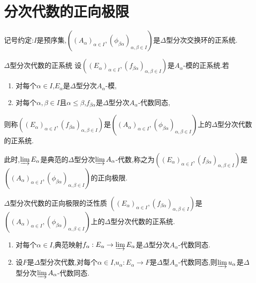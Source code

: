 \section{分次代数的正向极限}

记号约定:$I$是预序集,$\left(\left(A_{\alpha}\right)_{\alpha\in I},\left(\phi_{\beta\alpha}\right)_{\alpha,\beta\in I}\right)$是$\Delta$型分次交换环的正系统.

\begin{definition}{$\Delta$型分次代数的正系统}{}
	设$\left(\left(E_{\alpha}\right)_{\alpha\in I},\left(f_{\beta\alpha}\right)_{\alpha,\beta\in I}\right)$是$A_{\alpha}$-模的正系统.若
	\begin{enumerate}
		\item 对每个$\alpha\in I$,$E_{\alpha}$是$\Delta$型分次$A_{\alpha}$-模,
		\item 对每个$\alpha,\beta\in I$且$\alpha\leq\beta$,$f_{\beta\alpha}$是$\Delta$型分次$A_{\alpha}$-代数同态,
	\end{enumerate}
	则称$\left(\left(E_{\alpha}\right)_{\alpha\in I},\left(f_{\beta\alpha}\right)_{\alpha,\beta\in I}\right)$是$\left(\left(A_{\alpha}\right)_{\alpha\in I},\left(\phi_{\beta\alpha}\right)_{\alpha,\beta\in I}\right)$上的$\Delta$型分次代数的正系统.
	
	此时,$\varinjlim E_{\alpha}$是典范的$\Delta$型分次$\varinjlim A_{\alpha}$-代数,称之为$\left(\left(E_{\alpha}\right)_{\alpha\in I},\left(f_{\beta\alpha}\right)_{\alpha,\beta\in I}\right)$是$\left(\left(A_{\alpha}\right)_{\alpha\in I},\left(\phi_{\beta\alpha}\right)_{\alpha,\beta\in I}\right)$的正向极限.
\end{definition}

\begin{theorem}{$\Delta$型分次代数的正向极限的泛性质}{}
	$\left(\left(E_{\alpha}\right)_{\alpha\in I},\left(f_{\beta\alpha}\right)_{\alpha,\beta\in I}\right)$是$\left(\left(A_{\alpha}\right)_{\alpha\in I},\left(\phi_{\beta\alpha}\right)_{\alpha,\beta\in I}\right)$上的$\Delta$型分次代数的正系统.
	\begin{enumerate}
		\item 对每个$\alpha\in I$,典范映射$f_{\alpha}:E_{\alpha}\to\varinjlim E_{\alpha}$是$\Delta$型分次$A_{\alpha}$-代数同态.
		\item 设$F$是$\Delta$型分次代数,对每个$\alpha\in I$,$u_{\alpha}:E_{\alpha}\to F$是$\Delta$型$A_{\alpha}$-代数同态,则$\varinjlim u_{\alpha}$是$\Delta$型分次$\varinjlim A_{\alpha}$-代数同态.
	\end{enumerate}
\end{theorem}



